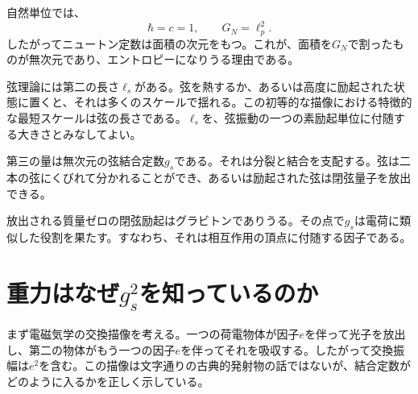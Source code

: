\begin{classroomqa}
\end{classroomqa}

自然単位では、
\begin{equation}
\hbar=c=1,
\qquad
G_N=\ell_p^2.
\label{eq:l06-planck-area}
\end{equation}
したがってニュートン定数は面積の次元をもつ。これが、面積を\(G_N\)で割ったものが無次元であり、エントロピーになりうる理由である。

弦理論には第二の長さ\(\ell_s\)がある。弦を熱するか、あるいは高度に励起された状態に置くと、それは多くのスケールで揺れる。この初等的な描像における特徴的な最短スケールは弦の長さである。\(\ell_s\)を、弦振動の一つの素励起単位に付随する大きさとみなしてよい。

第三の量は無次元の弦結合定数\(g_s\)である。それは分裂と結合を支配する。弦は二本の弦にくびれて分かれることができ、あるいは励起された弦は閉弦量子を放出できる。

\begin{classroomqa}
\end{classroomqa}

放出される質量ゼロの閉弦励起はグラビトンでありうる。その点で\(g_s\)は電荷に類似した役割を果たす。すなわち、それは相互作用の頂点に付随する因子である。

\section{重力はなぜ\texorpdfstring{\(g_s^2\)}{結合定数の二乗}を知っているのか}

まず電磁気学の交換描像を考える。一つの荷電物体が因子\(e\)を伴って光子を放出し、第二の物体がもう一つの因子\(e\)を伴ってそれを吸収する。したがって交換振幅は\(e^2\)を含む。この描像は文字通りの古典的発射物の話ではないが、結合定数がどのように入るかを正しく示している。

